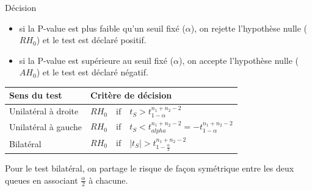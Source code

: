 \documentclass[ignorenonframetext,]{beamer}
\providecommand{\tightlist}{%
  \setlength{\itemsep}{0pt}\setlength{\parskip}{0pt}}
\begin{document}
\begin{frame}{Décision}
\protect\hypertarget{duxe9cision}{}

\begin{itemize}
\tightlist
\item
  si la P-value est plus faible qu'un seuil fixé (\(\alpha\)), on
  rejette l'hypothèse nulle (\(RH_0\)) et le test est déclaré positif.
\item
  si la P-value est supérieure au seuil fixé (\(\alpha\)), on accepte
  l'hypothèse nulle (\(AH_0\)) et le test est déclaré négatif.
\end{itemize}

\begin{longtable}[]{@{}ll@{}}
\toprule
\begin{minipage}[b]{0.40\columnwidth}\raggedright
Sens du test\strut
\end{minipage} & \begin{minipage}[b]{0.54\columnwidth}\raggedright
Critère de décision\strut
\end{minipage}\tabularnewline
\midrule
\endhead
\begin{minipage}[t]{0.40\columnwidth}\raggedright
Unilatéral à droite\strut
\end{minipage} & \begin{minipage}[t]{0.54\columnwidth}\raggedright
\(RH_0 \quad \text{if} \quad t_S > t_{1-\alpha}^{n_1 + n_2 -2}\)\strut
\end{minipage}\tabularnewline
\begin{minipage}[t]{0.40\columnwidth}\raggedright
Unilatéral à gauche\strut
\end{minipage} & \begin{minipage}[t]{0.54\columnwidth}\raggedright
\(RH_0 \quad \text{if} \quad t_S < t_{alpha}^{n_1 + n_2 -2} = - t_{1-\alpha}^{n_1 + n_2 -2}\)\strut
\end{minipage}\tabularnewline
\begin{minipage}[t]{0.40\columnwidth}\raggedright
Bilatéral\strut
\end{minipage} & \begin{minipage}[t]{0.54\columnwidth}\raggedright
\(RH_0 \quad \text{if} \quad \lvert t_S \rvert > t_{1-\frac{\alpha}{2}}^{n_1 + n_2 -2}\)\strut
\end{minipage}\tabularnewline
\bottomrule
\end{longtable}

Pour le test bilatéral, on partage le risque de façon symétrique entre
les deux queues en associant \(\frac{\alpha}{2}\) à chacune.

\end{frame}
\end{document}
